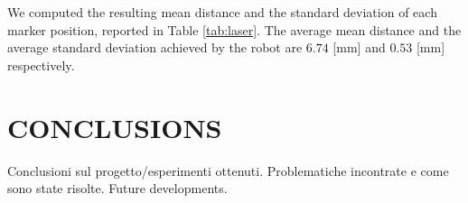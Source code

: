\documentclass[a4paper, 10 pt, conference]{ieeeconf}      %
\begin{document}
We computed the resulting mean distance and the standard deviation of each marker position, reported in Table \ref{tab:laser}. The average mean distance and the average standard deviation achieved by the robot are $6.74$ [mm] and $0.53$ [mm] respectively.

\section{CONCLUSIONS}

Conclusioni sul progetto/esperimenti ottenuti.
Problematiche incontrate e come sono state risolte.
Future developments.

\addtolength{\textheight}{-12cm}   %



\end{document}
